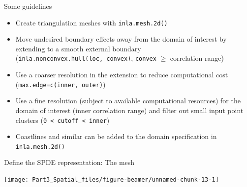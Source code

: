 \documentclass[
  ignorenonframetext,
]{beamer}
\newenvironment{Shaded}{\begin{snugshade}}{\end{snugshade}}
\newcommand{\AttributeTok}[1]{\textcolor[rgb]{0.77,0.63,0.00}{#1}}
\newcommand{\DecValTok}[1]{\textcolor[rgb]{0.00,0.00,0.81}{#1}}
\newcommand{\FunctionTok}[1]{\textcolor[rgb]{0.00,0.00,0.00}{#1}}
\newcommand{\NormalTok}[1]{#1}
\newcommand{\OtherTok}[1]{\textcolor[rgb]{0.56,0.35,0.01}{#1}}
\newcommand{\SpecialCharTok}[1]{\textcolor[rgb]{0.00,0.00,0.00}{#1}}
\begin{document}
\begin{frame}[fragile]{Some guidelines}
\protect\hypertarget{some-guidelines}{}
\begin{itemize}
\item
  Create triangulation meshes with \texttt{inla.mesh.2d()}
\item
  Move undesired boundary effects away from the domain of interest by
  extending to a smooth external boundary
  (\texttt{inla.nonconvex.hull(loc,\ convex)}, \texttt{convex} \(\geq\)
  correlation range)
\item
  Use a coarser resolution in the extension to reduce computational cost
  (\texttt{max.edge=c(inner,\ outer)})
\item
  Use a fine resolution (subject to available computational resources)
  for the domain of interest (inner correlation range) and filter out
  small input point clusters
  (\texttt{0\ \textless{}\ cutoff\ \textless{}\ inner})
\item
  Coastlines and similar can be added to the domain specification in
  \texttt{inla.mesh.2d()}
\end{itemize}
\end{frame}

\begin{frame}[fragile]{Define the SPDE representation: The mesh}
\protect\hypertarget{define-the-spde-representation-the-mesh-3}{}
\small

\begin{Shaded}
\end{Shaded}

\begin{center}\texttt{[image: Part3\_Spatial\_files/figure-beamer/unnamed-chunk-13-1]} \end{center}
\normalsize
\end{frame}
\end{document}
